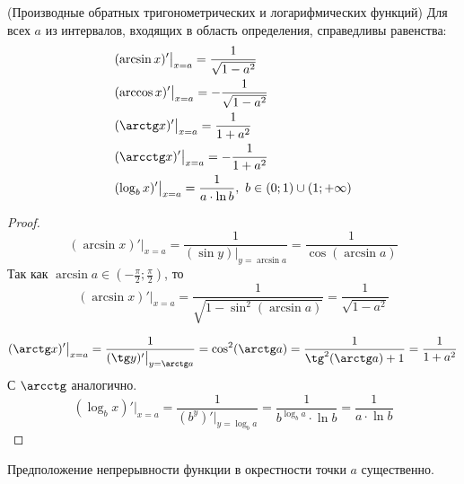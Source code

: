 \begin{corollary} (Производные обратных тригонометрических и логарифмических функций)
	Для всех $a$ из интервалов, входящих в область определения, справедливы равенства:
	\begin{align*}
		&(\arcsin x)' \big|_{x = a} = \frac{1}{\sqrt{1 - a^2}}
		\\
		&(\arccos x)' \big|_{x = a} = -\frac{1}{\sqrt{1 - a^2}}
		\\
		&(\arctg x)' \big|_{x = a} = \frac{1}{1 + a^2}
		\\
		&(\arcctg x)' \big|_{x = a} = -\frac{1}{1 + a^2}
		\\
		&(\log_b x)' \big|_{x = a} = \frac{1}{a \cdot \ln b},\ b \in (0; 1) \cup (1; +\infty)
	\end{align*}
\end{corollary}

\begin{proof}
	$$
		(\arcsin x)' \big|_{x = a} = \frac{1}{(\sin y) \big|_{y = \arcsin a}} = \frac{1}{\cos(\arcsin a)}
	$$
	Так как $\arcsin a \in (-\frac{\pi}{2}; \frac{\pi}{2})$, то
	$$
		(\arcsin x)' \big|_{x = a} = \frac{1}{\sqrt{1 - \sin^2(\arcsin a)}} = \frac{1}{\sqrt{1 - a^2}}
	$$
	
	$$
		(\arctg x)' \big|_{x = a} = \frac{1}{(\tg y)' \big|_{y = \arctg a}} = \cos^2 (\arctg a) = \frac{1}{\tg^2 (\arctg a) + 1} = \frac{1}{1 + a^2}
	$$
	С $\arcctg$ аналогично.
	$$
		(\log_b x)' \big|_{x = a} = \frac{1}{(b^y)' \big|_{y = \log_b a}} = \frac{1}{b^{\log_b a} \cdot \ln b} = \frac{1}{a \cdot \ln b}
	$$
\end{proof}

\begin{note}
	Предположение непрерывности функции в окрестности точки $a$ существенно.
\end{note}

